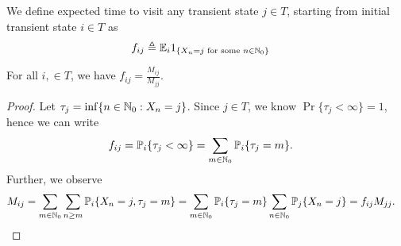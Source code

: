 \documentclass[a4paper,10pt,english]{article}
\begin{document}
We define expected time to visit any transient state $j \in T$, starting from initial transient state $i \in T$ as 
\begin{align*}
f_{ij} &\triangleq \mathbb{E}_i1_{\{X_n = j \text{ for some } n \in \mathbb{N}_0 \}}
\end{align*}
\begin{lem} 
For all $i, \in T$, we have $f_{ij} = \frac{M_{ij}}{M_{jj}}$.
\end{lem}
\begin{proof} 
Let $\tau_j = \inf\{ n \in \mathbb{N}_0 : X_n = j \}$. 
Since $j \in T$, we know $\Pr\{\tau_j < \infty \} = 1$, hence we can write 
\begin{align*}
f_{ij} &= \mathbb{P}_i\{\tau_j < \infty\} = \sum_{m \in \mathbb{N}_0}\mathbb{P}_i\{\tau_j = m\}.
\end{align*}
Further, we observe
\begin{align*}
M_{ij} &= \sum_{m \in \mathbb{N}_0}\sum_{n \geq m}\mathbb{P}_i\{X_n = j, \tau_j = m\} = \sum_{m \in \mathbb{N}_0}\mathbb{P}_i\{\tau_j = m\}\sum_{n \in \mathbb{N}_0}\mathbb{P}_j\{X_n = j\} = f_{ij}M_{jj}.
\end{align*}
\end{proof}
 
\end{document}
